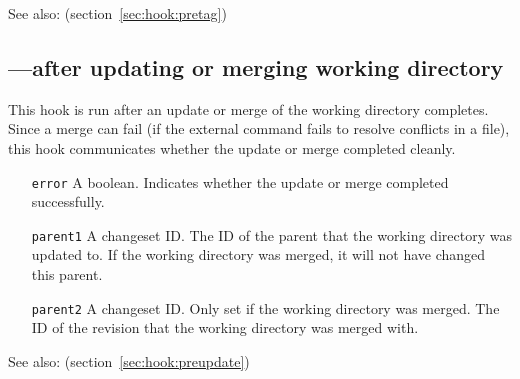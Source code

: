 See also:  (section~\ref{sec:hook:pretag})

\subsection{---after updating or merging working directory}
\label{sec:hook:update}

This hook is run after an update or merge of the working directory
completes.  Since a merge can fail (if the external 
command fails to resolve conflicts in a file), this hook communicates
whether the update or merge completed cleanly.

\begin{itemize}
\item[\texttt{error}] A boolean.  Indicates whether the update or
  merge completed successfully.
\item[\texttt{parent1}] A changeset ID.  The ID of the parent that the
  working directory was updated to.  If the working directory was
  merged, it will not have changed this parent.
\item[\texttt{parent2}] A changeset ID.  Only set if the working
  directory was merged.  The ID of the revision that the working
  directory was merged with.
\end{itemize}

See also:  (section~\ref{sec:hook:preupdate})

